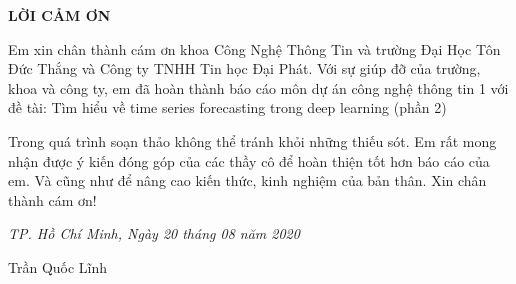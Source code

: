 \newpage	
\vspace{5cm} 

\begin{center}
	{
		\fontsize{16pt}{1}\selectfont
		\textbf{LỜI CẢM ƠN}
	}
\end{center} 		

\vspace{0.5cm}
Em xin chân thành cám ơn khoa Công Nghệ Thông Tin và trường Đại Học Tôn Đức Thắng và Công ty TNHH Tin học Đại Phát. Với sự giúp đỡ của trường, khoa và công ty, em đã hoàn thành báo cáo môn dự án công nghệ thông tin 1 với đề tài: Tìm hiểu về time series forecasting trong deep learning (phần 2)

Trong quá trình soạn thảo không thể tránh khỏi những thiếu sót. Em rất mong nhận được ý kiến đóng góp của các thầy cô để hoàn thiện tốt hơn báo cáo của em. Và cũng như để nâng cao kiến thức, kinh
nghiệm của bản thân. Xin chân thành cám ơn!
	

\begin{flushright}
	{\it TP. Hồ Chí Minh, Ngày 20 tháng 08 năm 2020 }
	
	Trần Quốc Lĩnh \hskip 2.5cm\quad
	
\end{flushright}
